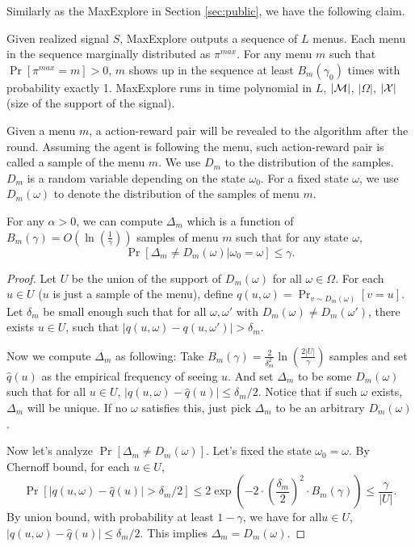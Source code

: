 Similarly as the MaxExplore in Section \ref{sec:public}, we have the following claim.
\begin{claim}
\label{clm:maxexplore_nocc}
Given realized signal $S$, MaxExplore outputs a sequence of $L$ menus. Each menu in the sequence marginally distributed as $\pi^{max}$. For any menu $m$ such that $\Pr[\pi^{max} = m] >0$, $m$ shows up in the sequence at least $B_m(\gamma_0)$ times with probability exactly 1. MaxExplore runs in time polynomial in $L$, $|\mathcal{M}|$, $|\varOmega|$, $|\mathcal{X}|$ (size of the support of the signal).
\end{claim}

Given a menu $m$, a action-reward pair will be revealed to the algorithm after the round. Assuming the agent is following the menu, such action-reward pair is called a sample of the menu $m$. We use $D_m$ to the distribution of the samples. $D_m$ is a random variable depending on the state $\omega_0$. For a fixed state $\omega$, we use $D_m(\omega)$ to denote the distribution of the samples of menu $m$.

\begin{lemma}
\label{lem:deltam}
For any $\alpha > 0$, we can compute $\Delta_m$ which is a function of $B_m(\gamma) = O\left(\ln\left(\frac{1}{\gamma}\right)\right)$ samples of menu $m$ such that for any state $\omega$,
\[
\Pr[\Delta_m \neq D_m(\omega) | \omega_0 = \omega] \leq \gamma.
\]
\end{lemma}

\begin{proof}
Let $U$ be the union of the support of $D_m(\omega)$ for all $\omega \in \varOmega$. For each $u \in U$ ($u$ is just a sample of the menu), define $q(u,\omega) = \Pr_{v \sim D_m(\omega)}[v = u]$. Let $\delta_m$ be small enough such that for all $\omega, \omega'$ with $D_m(\omega) \neq D_m(\omega')$, there exists $u \in U$, such that $|q(u,\omega) - q(u,\omega')| > \delta_m$.

Now we compute $\Delta_m$ as following: Take $B_m(\gamma) = \frac{2}{\delta_m^2}\ln\left(\frac{2|U|}{\gamma}\right) $ samples and set $\hat{q}(u)$ as the empirical frequency of seeing $u$. And set $\Delta_m$ to be some $D_m(\omega)$ such that for all $u \in U$, $|q(u,\omega) - \hat{q}(u)| \leq \delta_m / 2$. Notice that if such $\omega$ exists, $\Delta_m$ will be unique. If no $\omega$ satisfies this, just pick $\Delta_m$ to be an arbitrary $D_m(\omega)$.

Now let's analyze $\Pr[\Delta_m \neq D_m(\omega)]$. Let's fixed the state $\omega_0 = \omega$. By Chernoff bound, for each $u \in U$,
\[
\Pr[|q(u,\omega) -\hat{q}(u)| > \delta_m/2] \leq 2\exp\left(-2 \cdot \left(\frac{\delta_m}{2}\right)^2 \cdot B_m(\gamma)\right) \leq \frac{\gamma}{|U|}.
\]
By union bound, with probability at least $1-\gamma$, we have for all$u \in U$, $|q(u,\omega) - \hat{q}(u)| \leq \delta_m / 2$. This implies $\Delta_m = D_m(\omega)$.
\end{proof}


